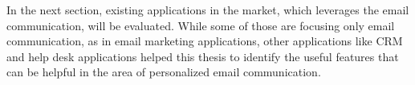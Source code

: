 In the next section, existing applications in the market, which leverages the email communication, will be evaluated. While some of those are focusing only email communication, as in email marketing applications, other applications like \ac{CRM} and help desk applications helped this thesis to identify the useful features that can be helpful in the area of personalized email communication.  


\begin{comment}

--> At the end of the chapter 2, a brief summary/conclusion could be helpful. Thereby, you could also put the related work in perspective to your problem statement, i.e. explaining where the existing work falls short or can be improved (by your solution).


 .... talk about dillman and finish, it is opposite idea, so keep it in this section, sonra overview of tools, de ama once be review et hocaya yolla

--> Respondendts start asking questions to clarify things E21 p446
--> bunu sorunlar kisminda yazabilirisin, niye CRM ihtiyac duydugunu acikliyor: personalization lost its effect on recent years cause of programs p152 dillman ebook 2007 - dillman kitap p237
--> E14 p379 da mail be email aslinda ayni diyor. E18 p1371 altini maviyle cizdin
--> M1, there is a table showing response rate comparison of email vs paper for many studies. USE IT
--> Mention about which of the errors are not applicable to us. Eg.g sampling since we can predefined list of people
--> 10.1.1.189.3715.pdf "Assistance: The Work Practices of Human Administrative Assistants and their Implications for IT and Organizations"speak about the assistance support
--> Bi section adi bu olsun, survey uzerine yazdiklarin bittikten sonra: The issues with email communication
--> Burden on the Researcher E21p442, bunu sonra anlat IYI

--> Talked about the 4 issues of survey in here, and those issues are applicable to emails
--> Compare Web surveys and EMail
--> write about low response rate comparing with mail
--> 7 pages, then comparison of existing products, then crowsourcing (MAYBE you can write about assistant support using Michael's paper), then first prototype, then final, mention about the improvements
--> A chapter about assistance support 10.1.1.189.3715.pdf "Assistance: The Work Practices of Human Administrative Assistants and their Implications for IT and Organizations"
--> Write about people's email life PIP_Work_Email_Report.pdf.pdf



\end{comment}
